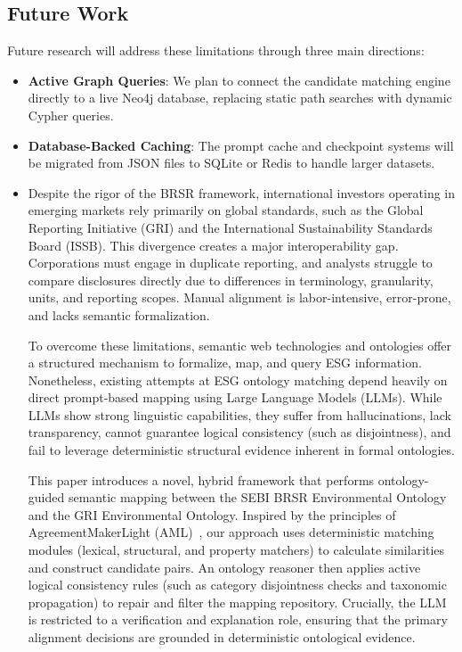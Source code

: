 \documentclass[journal,compsoc]{IEEEtran}
\begin{document}
\begin{itemize}
\begin{table}[t]
\section{Future Work}
Future research will address these limitations through three main directions:
\begin{itemize}
    \item \textbf{Active Graph Queries}: We plan to connect the candidate matching engine directly to a live Neo4j database, replacing static path searches with dynamic Cypher queries.
    \item \textbf{Database-Backed Caching}: The prompt cache and checkpoint systems will be migrated from JSON files to SQLite or Redis to handle larger datasets.
    \item Despite the rigor of the BRSR framework, international investors operating in emerging markets rely primarily on global standards, such as the Global Reporting Initiative (GRI) and the International Sustainability Standards Board (ISSB). This divergence creates a major interoperability gap. Corporations must engage in duplicate reporting, and analysts struggle to compare disclosures directly due to differences in terminology, granularity, units, and reporting scopes. Manual alignment is labor-intensive, error-prone, and lacks semantic formalization. 

To overcome these limitations, semantic web technologies and ontologies offer a structured mechanism to formalize, map, and query ESG information. Nonetheless, existing attempts at ESG ontology matching depend heavily on direct prompt-based mapping using Large Language Models (LLMs). While LLMs show strong linguistic capabilities, they suffer from hallucinations, lack transparency, cannot guarantee logical consistency (such as disjointness), and fail to leverage deterministic structural evidence inherent in formal ontologies.

This paper introduces a novel, hybrid framework that performs ontology-guided semantic mapping between the SEBI BRSR Environmental Ontology and the GRI Environmental Ontology. Inspired by the principles of AgreementMakerLight (AML)~\cite{aml2013}, our approach uses deterministic matching modules (lexical, structural, and property matchers) to calculate similarities and construct candidate pairs. An ontology reasoner then applies active logical consistency rules (such as category disjointness checks and taxonomic propagation) to repair and filter the mapping repository. Crucially, the LLM is restricted to a verification and explanation role, ensuring that the primary alignment decisions are grounded in deterministic ontological evidence.


\end{itemize}
\end{table}
\end{itemize}
\end{document}
